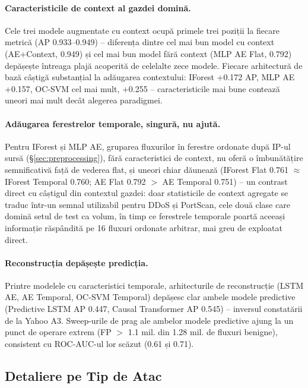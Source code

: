\paragraph{Caracteristicile de context al gazdei domină.} Cele trei modele augmentate cu context ocupă primele trei poziții la fiecare metrică (AP 0.933--0.949) -- diferența dintre cel mai bun model cu context (AE+Context, 0.949) și cel mai bun model fără context (MLP AE Flat, 0.792) depășește întreaga plajă acoperită de celelalte zece modele. Fiecare arhitectură de bază câștigă substanțial la adăugarea contextului: IForest +0.172 AP, MLP AE +0.157, OC-SVM cel mai mult, +0.255 -- caracteristicile mai bune contează uneori mai mult decât alegerea paradigmei.

\paragraph{Adăugarea ferestrelor temporale, singură, nu ajută.} Pentru IForest și MLP AE, gruparea fluxurilor în ferestre ordonate după IP-ul sursă (\S\ref{sec:preprocessing}), fără caracteristici de context, nu oferă o îmbunătățire semnificativă față de vederea flat, și uneori chiar dăunează (IForest Flat 0.761 $\approx$ IForest Temporal 0.760; AE Flat 0.792 $>$ AE Temporal 0.751) -- un contrast direct cu câștigul din contextul gazdei: doar statisticile de context agregate se traduc într-un semnal utilizabil pentru DDoS și PortScan, cele două clase care domină setul de test ca volum, în timp ce ferestrele temporale poartă aceeași informație răspândită pe 16 fluxuri ordonate arbitrar, mai greu de exploatat direct.

\paragraph{Reconstrucția depășește predicția.} Printre modelele cu caracteristici temporale, arhitecturile de reconstrucție (LSTM AE, AE Temporal, OC-SVM Temporal) depășesc clar ambele modele predictive (Predictive LSTM AP 0.447, Causal Transformer AP 0.545) -- inversul constatării de la Yahoo A3. Sweep-urile de prag ale ambelor modele predictive ajung la un punct de operare extrem (FP $>$ 1.1 mil. din 1.28 mil. de fluxuri benigne), consistent cu ROC-AUC-ul lor scăzut (0.61 și 0.71).

\subsection{Detaliere pe Tip de Atac}
\label{sec:cic-per-attack}

